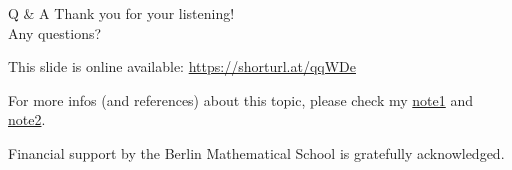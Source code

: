 \documentclass[pdf]{beamer}
\numberwithin{equation}{section}
\theoremstyle{plain}
\theoremstyle{plain}
\theoremstyle{remark}
\begin{document}
\begin{frame}[fragile]{Q \& A}
Thank you for your listening! 
\\[3mm]
Any questions?

\vspace{8mm}




This slide is online available:
\href{https://github.com/ramified/personal_tex_collection/raw/main/PhD_thesis_raw_data/talk_12min/Bologna_zxx_intro_to_Zchi.pdf}{https://shorturl.at/qqWDe}


For more infos (and references) about this topic, please check my  \href{https://github.com/ramified/personal_tex_collection/blob/main/PhD_thesis_raw_data/dim_of_Zchi.pdf}{note1} and \href{https://github.com/ramified/personal_tex_collection/raw/main/PhD_thesis_raw_data/subvarieties/subvarieties_in_abelian_variety.pdf}{note2}.

\vspace{8mm}
Financial support by the Berlin Mathematical School is gratefully acknowledged.


\end{frame}
\end{document}
